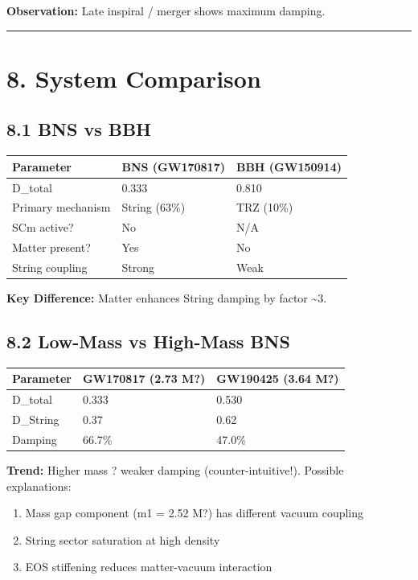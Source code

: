 \documentclass[11pt]{article}
\begin{document}
\textbf{Observation:} Late inspiral / merger shows maximum damping.

\noindent\rule{\textwidth}{0.4pt}

\section*{8. System Comparison}

\subsection*{8.1 BNS vs BBH}

\begin{center}
\begin{longtable}{lll}
\toprule
Parameter & BNS (GW170817) & BBH (GW150914) \tabularnewline
\midrule
\endhead
D\_total & 0.333 & 0.810 \tabularnewline
Primary mechanism & String (63\%) & TRZ (10\%) \tabularnewline
SCm active? & No & N/A \tabularnewline
Matter present? & Yes & No \tabularnewline
String coupling & Strong & Weak \tabularnewline
\bottomrule
\end{longtable}
\end{center}

\textbf{Key Difference:} Matter enhances String damping by factor \textasciitilde{}3.

\subsection*{8.2 Low-Mass vs High-Mass BNS}

\begin{center}
\begin{longtable}{lll}
\toprule
Parameter & GW170817 (2.73 M?) & GW190425 (3.64 M?) \tabularnewline
\midrule
\endhead
D\_total & 0.333 & 0.530 \tabularnewline
D\_String & 0.37 & 0.62 \tabularnewline
Damping & 66.7\% & 47.0\% \tabularnewline
\bottomrule
\end{longtable}
\end{center}

\textbf{Trend:} Higher mass ? weaker damping (counter-intuitive!). Possible explanations:

\begin{enumerate}
  \item Mass gap component (m1 = 2.52 M?) has different vacuum coupling
  \item String sector saturation at high density
  \item EOS stiffening reduces matter-vacuum interaction
\end{enumerate}
\end{document}
